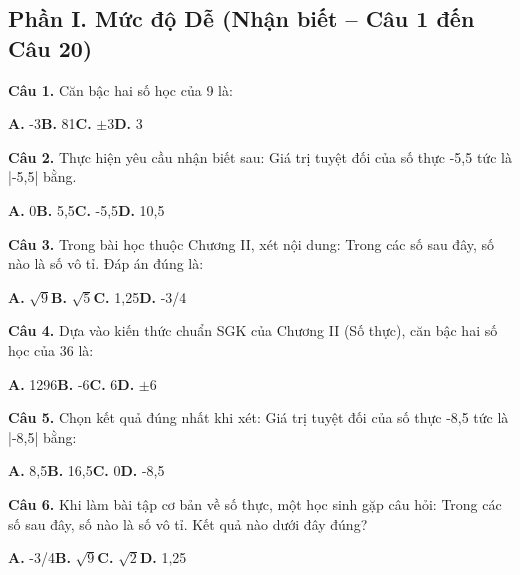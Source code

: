 \documentclass[11pt,a4paper]{article}
\begin{document}
\subsection*{\color{accent} Phần I. Mức độ Dễ (Nhận biết -- Câu 1 đến Câu 20)}
\textbf{\color{primary} Câu 1.} Căn bậc hai số học của 9 là:\par
\hspace*{1.5em}\textbf{A.} -3\quad\quad \textbf{B.} 81\quad\quad \textbf{C.} $\pm$3\quad\quad \textbf{D.} 3\par\vspace{2pt}
\textbf{\color{primary} Câu 2.} Thực hiện yêu cầu nhận biết sau: Giá trị tuyệt đối của số thực -5,5 tức là |-5,5| bằng.\par
\hspace*{1.5em}\textbf{A.} 0\quad\quad \textbf{B.} 5,5\quad\quad \textbf{C.} -5,5\quad\quad \textbf{D.} 10,5\par\vspace{2pt}
\textbf{\color{primary} Câu 3.} Trong bài học thuộc Chương II, xét nội dung: Trong các số sau đây, số nào là số vô tỉ. Đáp án đúng là:\par
\hspace*{1.5em}\textbf{A.} $\sqrt{9}$\quad\quad \textbf{B.} $\sqrt{5}$\quad\quad \textbf{C.} 1,25\quad\quad \textbf{D.} -3/4\par\vspace{2pt}
\textbf{\color{primary} Câu 4.} Dựa vào kiến thức chuẩn SGK của Chương II (Số thực), căn bậc hai số học của 36 là:\par
\hspace*{1.5em}\textbf{A.} 1296\quad\quad \textbf{B.} -6\quad\quad \textbf{C.} 6\quad\quad \textbf{D.} $\pm$6\par\vspace{2pt}
\textbf{\color{primary} Câu 5.} Chọn kết quả đúng nhất khi xét: Giá trị tuyệt đối của số thực -8,5 tức là |-8,5| bằng:\par
\hspace*{1.5em}\textbf{A.} 8,5\quad\quad \textbf{B.} 16,5\quad\quad \textbf{C.} 0\quad\quad \textbf{D.} -8,5\par\vspace{2pt}
\textbf{\color{primary} Câu 6.} Khi làm bài tập cơ bản về số thực, một học sinh gặp câu hỏi: Trong các số sau đây, số nào là số vô tỉ. Kết quả nào dưới đây đúng?\par
\hspace*{1.5em}\textbf{A.} -3/4\quad\quad \textbf{B.} $\sqrt{9}$\quad\quad \textbf{C.} $\sqrt{2}$\quad\quad \textbf{D.} 1,25\par\vspace{2pt}
\end{document}
